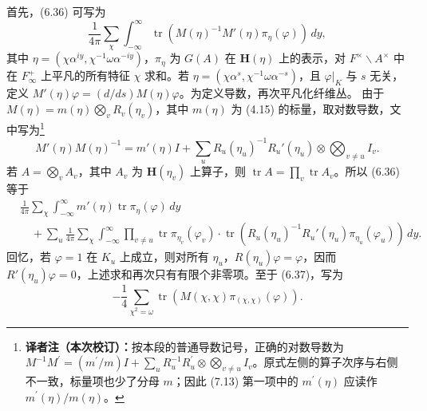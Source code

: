 首先，(6.36) 可写为
\[
 \frac1{4\pi}\sum_\chi\int_{-\infty}^{\infty}
 \operatorname{tr}(M(\eta)^{-1}M'(\eta)\pi_\eta(\varphi))\,dy,
\]
其中 $\eta=(\chi\alpha^{iy},\chi^{-1}\omega\alpha^{-iy})$，$\pi_\eta$ 为
$G(A)$ 在 $\mathbf H(\eta)$ 上的表示，对 $F^\times\backslash A^\times$ 中在 $F_\infty^+$ 上平凡的所有特征 $\chi$ 求和。若
$\eta=(\chi\alpha^s,\chi^{-1}\omega\alpha^{-s})$，且 $\varphi|_K$ 与 $s$ 无关，定义
$M'(\eta)\varphi=(d/ds)M(\eta)\varphi$。为定义导数，再次平凡化纤维丛。
由于 $M(\eta)=m(\eta)\bigotimes_vR_v(\eta_v)$，其中 $m(\eta)$ 为 (4.15) 的标量，取对数导数，文中写为\footnote{\textbf{译者注（本次校订）：}按本段的普通导数记号，正确的对数导数为 $M^{-1}M^{\prime}=(m^{\prime}/m)I+\sum_u R_u^{-1}R_u^{\prime}\otimes\bigotimes_{v\ne u}I_v$。原式左侧的算子次序与右侧不一致，标量项也少了分母 $m$；因此 (7.13) 第一项中的 $m^{\prime}(\eta)$ 应读作 $m^{\prime}(\eta)/m(\eta)$。}
\[
 M'(\eta)M(\eta)^{-1}
 =m'(\eta)I+\sum_uR_u(\eta_u)^{-1}R_u'(\eta_u)\otimes\bigotimes_{v\ne u}I_v.
\]
若 $A=\bigotimes_vA_v$，其中 $A_v$ 为 $\mathbf H(\eta_v)$ 上算子，则
$\operatorname{tr}A=\prod_v\operatorname{tr}A_v$。所以 (6.36) 等于
\begin{equation}
\begin{split}
 &\frac1{4\pi}\sum_\chi\int_{-\infty}^{\infty}
 m'(\eta)\operatorname{tr}\pi_\eta(\varphi)\,dy\\
 &\quad+\sum_u\frac1{4\pi}\sum_\chi\int_{-\infty}^{\infty}
 \prod_{v\ne u}\operatorname{tr}\pi_{\eta_v}(\varphi_v)
 \cdot\operatorname{tr}(R_u(\eta_u)^{-1}R_u'(\eta_u)\pi_{\eta_u}(\varphi_u))\,dy.
\end{split}\tag{7.13}
\end{equation}
回忆，若 $\varphi=1$ 在 $K_u$ 上成立，则对所有 $\eta_u$，$R(\eta_u)\varphi=\varphi$，因而
$R'(\eta_u)\varphi=0$，上述求和再次只有有限个非零项。至于 (6.37)，写为
\[
 -\frac14\sum_{\chi^2=\omega}\operatorname{tr}(M(\chi,\chi)\pi_{(\chi,\chi)}(\varphi)).
\]

